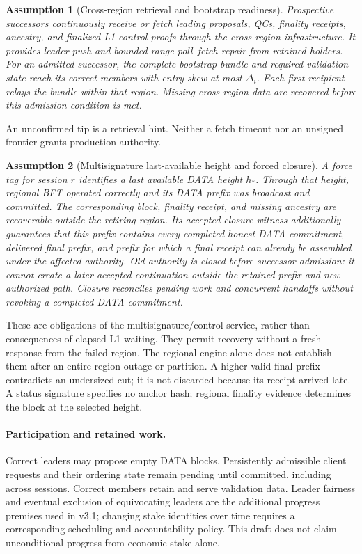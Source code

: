 \documentclass[11pt,a4paper]{article}
\newtheorem{assumption}[assumption]{Assumption}
\begin{document}
\begin{assumption}[Cross-region retrieval and bootstrap readiness]
\label{ass:infra}
Prospective successors continuously receive or fetch leading proposals,
QCs, finality receipts, ancestry, and finalized L1 control proofs through
the cross-region infrastructure. It provides leader push and bounded-range
poll--fetch repair from retained holders. For an admitted successor, the
complete bootstrap bundle and required validation state reach its correct
members with entry skew at most $\Delta_i$. Each first recipient relays
the bundle within that region. Missing cross-region data are recovered
before this admission condition is met.
\end{assumption}
An unconfirmed tip is a retrieval hint. Neither a fetch timeout nor an
unsigned frontier grants production authority.

\begin{assumption}[Multisignature last-available height and forced closure]
\label{ass:cut}
A force tag for session $r$ identifies a last available DATA height $h_*$.
Through that height, regional BFT operated correctly and its DATA prefix
was broadcast and committed. The corresponding block, finality receipt,
and missing ancestry are recoverable outside the retiring region.
Its accepted closure witness additionally guarantees that this prefix
contains every completed honest DATA commitment, delivered final prefix,
and prefix for which a final receipt can already be assembled under the
affected authority. Old authority is closed before successor admission:
it cannot create a later accepted continuation outside the retained prefix
and new authorized path. Closure reconciles pending work and concurrent
handoffs without revoking a completed DATA commitment.
\end{assumption}
These are obligations of the multisignature/control service, rather than
consequences of elapsed L1 waiting. They permit recovery without a fresh
response from the failed region. The regional engine alone does not
establish them after an entire-region outage or partition. A higher valid
final prefix contradicts an undersized cut; it is not discarded because
its receipt arrived late. A status signature specifies no anchor hash;
regional finality evidence determines the block at the selected height.

\paragraph{Participation and retained work.}
Correct leaders may propose empty DATA blocks. Persistently admissible
client requests and their ordering state remain pending until committed,
including across sessions. Correct members retain and serve validation
data. Leader fairness and eventual exclusion of equivocating leaders are
the additional progress premises used in v3.1; changing stake identities
over time requires a corresponding scheduling and accountability policy.
This draft does not claim unconditional progress from economic stake alone.
\end{document}
